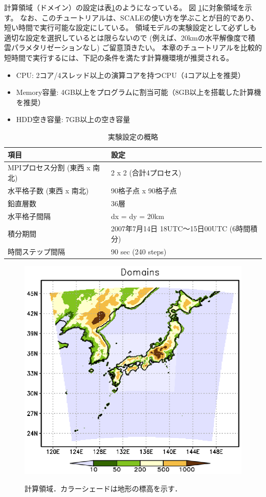 計算領域（ドメイン）の設定は表\ref{tab:grids}のようになっている。
図 \ref{fig:tutrial_real_domain}に対象領域を示す。
なお、このチュートリアルは、SCALEの使い方を学ぶことが目的であり、
短い時間で実行可能な設定にしている。
領域モデルの実験設定として必ずしも適切な設定を選択しているとは限らないので
(例えば、20kmの水平解像度で積雲パラメタリゼーションなし)
ご留意頂きたい。
本章のチュートリアルを比較的短時間で実行するには、下記の条件を満たす計算機環境が推奨される。
\begin{itemize}
\item CPU: 2コア/4スレッド以上の演算コアを持つCPU（4コア以上を推奨）
\item Memory容量: 4GB以上をプログラムに割当可能（8GB以上を搭載した計算機を推奨）
\item HDD空き容量: 7GB以上の空き容量
\end{itemize}



\begin{table}[h]
\begin{center}
  \caption{実験設定の概略}
  \label{tab:grids}
  \begin{tabularx}{150mm}{|l|X|} \hline
    \rowcolor[gray]{0.9} 項目 & 設定 \\ \hline
    MPIプロセス分割 (東西 x 南北) & 2 x 2 (合計4プロセス) \\ \hline
    水平格子数 (東西 x 南北) & 90格子点 x 90格子点 \\ \hline
    鉛直層数                 & 36層                  \\ \hline
    水平格子間隔             & dx = dy = 20km       \\ \hline
    積分期間 & 2007年7月14日 18UTC～15日00UTC (6時間積分) \\ \hline
    時間ステップ間隔 & 90 sec (240 steps) \\ \hline
  \end{tabularx}
\end{center}
\end{table}

\begin{figure}[tb]
\begin{center}
  \includegraphics[width=0.5\hsize]{./figure/real_domain.eps}\\
  \caption{計算領域．カラーシェードは地形の標高を示す．}
  \label{fig:tutrial_real_domain}
\end{center}
\end{figure}


